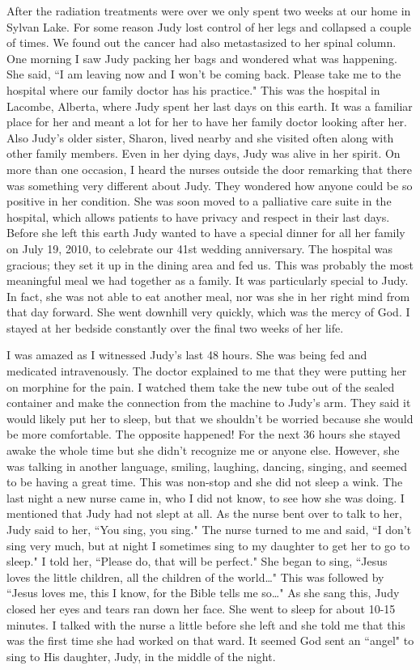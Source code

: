 \documentclass[oneside,12pt]{book}
\begin{document}
After the radiation treatments were over we only spent two weeks at our home in Sylvan Lake. For some reason Judy lost control of her legs and collapsed a couple of times. We found out the cancer had also metastasized to her spinal column. One morning I saw Judy packing her bags and wondered what was happening. She said, ``I am leaving now and I won't be coming back. Please take me to the hospital where our family doctor has his practice." This was the hospital in Lacombe, Alberta, where Judy spent her last days on this earth. It was a familiar place for her and meant a lot for her to have her family doctor looking after her. Also Judy's older sister, Sharon, lived nearby and she visited often along with other family members. Even in her dying days, Judy was alive in her spirit. On more than one occasion, I heard the nurses outside the door remarking that there was something very different about Judy. They wondered how anyone could be so positive in her condition. She was soon moved to a palliative care suite in the hospital, which allows patients to have privacy and respect in their last days. Before she left this earth Judy wanted to have a special dinner for all her family on July 19, 2010, to celebrate our 41st wedding anniversary. The hospital was gracious; they set it up in the dining area and fed us. This was probably the most meaningful meal we had together as a family. It was particularly special to Judy. In fact, she was not able to eat another meal, nor was she in her right mind from that day forward. She went downhill very quickly, which was the mercy of God. I stayed at her bedside constantly over the final two weeks of her life. 

I was amazed as I witnessed Judy's last 48 hours. She was being fed and medicated intravenously. The doctor explained to me that they were putting her on morphine for the pain. I watched them take the new tube out of the sealed container and make the connection from the machine to Judy's arm. They said it would likely put her to sleep, but that we shouldn't be worried because she would be more comfortable. The opposite happened! For the next 36 hours she stayed awake the whole time but she didn't recognize me or anyone else. However, she was talking in another language, smiling, laughing, dancing, singing, and seemed to be having a great time. This was non-stop and she did not sleep a wink. The last night a new nurse came in, who I did not know, to see how she was doing. I mentioned that Judy had not slept at all. As the nurse bent over to talk to her, Judy said to her, ``You sing, you sing." The nurse turned to me and said, ``I don't sing very much, but at night I sometimes sing to my daughter to get her to go to sleep." I told her, ``Please do, that will be perfect." She began to sing, ``Jesus loves the little children, all the children of the world…" This was followed by ``Jesus loves me, this I know, for the Bible tells me so…" As she sang this, Judy closed her eyes and tears ran down her face. She went to sleep for about 10-15 minutes. I talked with the nurse a little before she left and she told me that this was the first time she had worked on that ward. It seemed God sent an ``angel" to sing to His daughter, Judy, in the middle of the night. 
\end{document}
